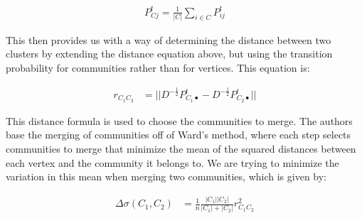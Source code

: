 \documentclass{article}
\begin{document}
    \begin{align}
        P^t_{Cj} = \frac{1}{|C|} \sum_{i \in C}P^t_{ij}
    \end{align}

    This then provides us with a way of determining the distance between two clusters by extending the distance equation above, but using the transition probability for communities rather than for vertices. This equation is:

    \begin{align}
        r_{C_1C_2} &= ||D^{-\frac{1}{2}}P^t_{C_1\bullet} - D^{-\frac{1}{2}}P^t_{C_2\bullet}||
    \end{align}

    This distance formula is used to choose the communities to merge. The authors base the merging of communities off of Ward's method, where each step selects communities to merge that minimize the mean of the squared distances between each vertex and the community it belongs to. We are trying to minimize the variation in this mean when merging two communities, which is given by:

    \begin{align}
        \Delta\sigma(C_1,C_2) &= \frac{1}{n}\frac{|C_1||C_2|}{|C_1| + |C_2|}r^2_{C_1C_2}
    \end{align}
\end{document}
